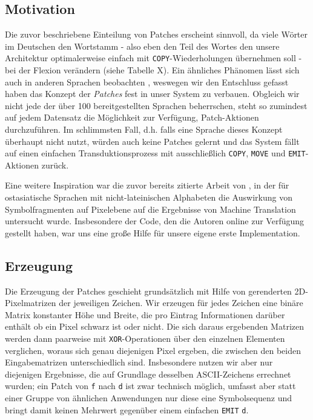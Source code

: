\documentclass[11pt,a4paper]{article}
\newcommand{\action}[1]{\texttt{#1}}
\begin{document}
\subsection{Motivation}
Die zuvor beschriebene Einteilung von Patches erscheint sinnvoll, da viele Wörter im Deutschen den Wortstamm - also eben den Teil des Wortes den unsere Architektur optimalerweise einfach mit \action{COPY}-Wiederholungen übernehmen soll - bei der Flexion verändern (siehe Tabelle X).
Ein ähnliches Phänomen lässt sich auch in anderen Sprachen beobachten \citep{wiese:umlaut2009, kendris:cedilla2001}, weswegen wir den Entschluss gefasst haben das Konzept der \textit{Patches} fest in unser System zu verbauen. Obgleich wir nicht jede der über 100 bereitgestellten Sprachen beherrschen, steht so zumindest auf jedem Datensatz die Möglichkeit zur Verfügung, Patch-Aktionen durchzuführen. Im schlimmsten Fall, d.h. falls eine Sprache dieses Konzept überhaupt nicht nutzt, würden auch keine Patches gelernt und das System fällt auf einen einfachen Transduktionsprozess mit ausschließlich \action{COPY}, \action{MOVE} und \action{EMIT}-Aktionen zurück.

Eine weitere Inspiration war die zuvor bereits zitierte Arbeit von \citet{cjk-mt:LiuLLN17}, in der für ostasiatische Sprachen mit nicht-lateinischen Alphabeten die Auswirkung von Symbolfragmenten auf Pixelebene auf die Ergebnisse von Machine Translation untersucht wurde.
Insbesondere der Code, den die Autoren online zur Verfügung gestellt haben, war uns eine große Hilfe für unsere eigene erste Implementation.

\subsection{Erzeugung}
Die Erzeugung der Patches geschieht grundsätzlich mit Hilfe von gerenderten 2D-Pixelmatrizen der jeweiligen Zeichen. Wir erzeugen für jedes Zeichen eine binäre Matrix konstanter Höhe und Breite, die pro Eintrag Informationen darüber enthält ob ein Pixel schwarz ist oder nicht.
Die sich daraus ergebenden Matrizen werden dann paarweise mit \texttt{XOR}-Operationen über den einzelnen Elementen verglichen, woraus sich genau diejenigen Pixel ergeben, die zwischen den beiden Eingabematrizen unterschiedlich sind. Insbesondere nutzen wir aber nur diejenigen Ergebnisse, die auf Grundlage desselben ASCII-Zeichens errechnet wurden; ein Patch von \texttt{f} nach \texttt{d} ist zwar technisch möglich, umfasst aber statt einer Gruppe von ähnlichen Anwendungen nur diese eine Symbolsequenz und bringt damit keinen Mehrwert gegenüber einem einfachen \action{EMIT} \texttt{d}.
\end{document}
